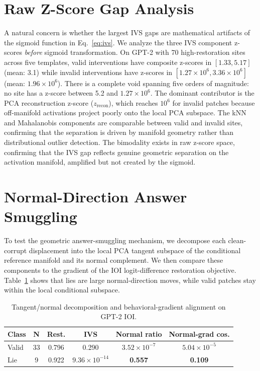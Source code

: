 \documentclass{article}
\begin{document}
\section{Raw Z-Score Gap Analysis}
\label{app:zscore}

A natural concern is whether the largest IVS gaps are mathematical artifacts of the sigmoid function in Eq.~\ref{eq:ivs}. We analyze the three IVS component z-scores \emph{before} sigmoid transformation. On GPT-2 with 70 high-restoration sites across five templates, valid interventions have composite z-scores in $[1.33, 5.17]$ (mean: 3.1) while invalid interventions have z-scores in $[1.27{\times}10^6, 3.36{\times}10^6]$ (mean: $1.96{\times}10^6$). There is a complete void spanning five orders of magnitude: no site has a z-score between 5.2 and $1.27{\times}10^6$. The dominant contributor is the PCA reconstruction z-score ($z_\text{recon}$), which reaches $10^6$ for invalid patches because off-manifold activations project poorly onto the local PCA subspace. The kNN and Mahalanobis components are comparable between valid and invalid sites, confirming that the separation is driven by manifold geometry rather than distributional outlier detection. The bimodality exists in raw z-score space, confirming that the IVS gap reflects genuine geometric separation on the activation manifold, amplified but not created by the sigmoid.

\section{Normal-Direction Answer Smuggling}
\label{app:normal}

To test the geometric answer-smuggling mechanism, we decompose each clean-corrupt displacement into the local PCA tangent subspace of the conditional reference manifold and its normal complement. We then compare these components to the gradient of the IOI logit-difference restoration objective. Table~\ref{tab:normal} shows that lies are large normal-direction moves, while valid patches stay within the local conditional subspace.

\begin{table}[h]
\caption{Tangent/normal decomposition and behavioral-gradient alignment on GPT-2 IOI.}
\label{tab:normal}
\begin{center}\small
\begin{tabular}{lccccc}
\toprule
\textbf{Class} & \textbf{N} & \textbf{Rest.} & \textbf{IVS} & \textbf{Normal ratio} & \textbf{Normal-grad cos.} \\
\midrule
Valid & 33 & 0.796 & 0.290 & $3.52{\times}10^{-7}$ & $5.04{\times}10^{-5}$ \\
Lie & 9 & 0.922 & $9.36{\times}10^{-14}$ & \textbf{0.557} & \textbf{0.109} \\
\bottomrule
\end{tabular}
\end{center}
\end{table}
\end{document}
